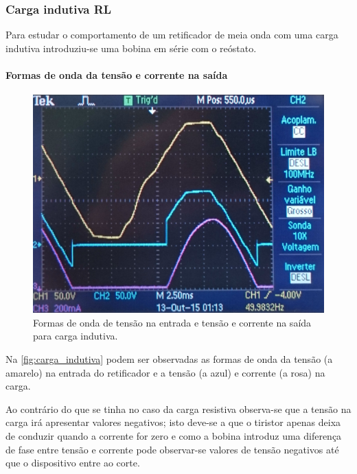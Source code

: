 \documentclass[a4paper,11pt]{article}
\numberwithin{equation}{section}
\begin{document}
\subsubsection{Carga indutiva RL}

Para estudar o comportamento de um retificador de meia onda com uma carga indutiva introduziu-se uma bobina em série com o reóstato.

\paragraph{Formas de onda da tensão e corrente na saída}

\begin{figure}[h]
	\centering
	\includegraphics[keepaspectratio=true, scale=0.13]{img/figs/carga_indutiva}
	\caption{Formas de onda de tensão na entrada e tensão e corrente na saída para carga indutiva.}
	\label{fig:carga_indutiva}
	\vspace{-0.8em}
\end{figure}

Na \autoref{fig:carga_indutiva} podem ser observadas as formas de onda da tensão (a amarelo) na entrada do retificador e a tensão (a azul) e corrente (a rosa) na carga.

Ao contrário do que se tinha no caso da carga resistiva observa-se que a tensão na carga irá apresentar valores negativos; isto deve-se a que o tiristor apenas deixa de conduzir quando a corrente for zero e como a bobina introduz uma diferença de fase entre tensão e corrente pode observar-se valores de tensão negativos até que o dispositivo entre ao corte.
\end{document}
